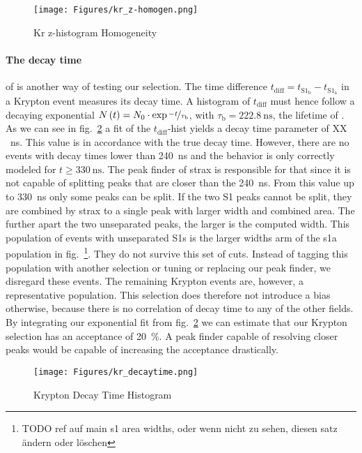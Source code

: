 \begin{figure}
\centering
\texttt{[image: Figures/kr\_z-homogen.png]}  %
\caption[Kr z-histogram Homogeneity]{
    Kr z-histogram Homogeneity
    }
\label{fig:z-hist-homogen}
\end{figure}



\paragraph{The decay time} of  is another way of testing our selection.
The time difference $ t_\mathrm{diff} = t_{\mathrm{S}1_\mathrm{b}} - t_{\mathrm{S}1_\mathrm{a}} $ in a Krypton event measures its decay time.
A histogram of $ t_\mathrm{diff} $ must hence follow a decaying exponential $ N \left( t \right) = N_0 \cdot \exp{\nicefrac{-t}{\tau_\mathrm{b}}} $, with $ \tau_\mathrm{b} = \SI{222.8}{\nano\s} $, the lifetime of .
As we can see in fig.~\ref{fig:kr-decaytime} a fit of the $ t_\mathrm{diff} $-hist yields a decay time parameter of XX \SI{}{\nano\s}. %
This value is in accordance with the true decay time. %
However, there are no events with decay times lower than \SI{240}{\nano\s} and the behavior is only correctly modeled for $ t \ge \SI{330}{\nano\s} $.
The peak finder of strax is responsible for that since it is not capable of splitting peaks that are closer than the \SI{240}{\nano\s}.
From this value up to \SI{330}{\nano\s} only some peaks can be split.
If the two S1 peaks cannot be split, they are combined by strax to a single peak with larger width and combined area.
The further apart the two unseparated peaks, the larger is the computed width.
This population of events with unseparated S1s is the larger widths arm of the \gls{s1a} population in fig.~\footnote{TODO ref auf main s1 area widths, oder wenn nicht zu sehen, diesen satz ändern oder löschen}.
They do not survive this set of cuts.
Instead of tagging this population with another selection or tuning or replacing our peak finder, we disregard these events.
The remaining Krypton events are, however, a representative population.
This selection does therefore not introduce a bias otherwise, because there is no correlation of decay time to any of the other fields.
By integrating our exponential fit from fig.~\ref{fig:kr-decaytime} we can estimate that our Krypton selection has an acceptance of \SI{20}{\%}.
A peak finder capable of resolving closer peaks would be capable of increasing the acceptance drastically.


\begin{figure}
\centering
\texttt{[image: Figures/kr\_decaytime.png]}  %
\caption[Krypton Decay Time Histogram]{
    Krypton Decay Time Histogram
    }
\label{fig:kr-decaytime}
\end{figure}



\FloatBarrier

